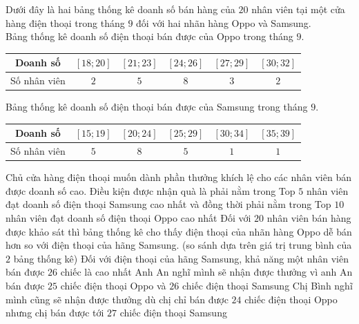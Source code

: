 \begin{ex}%
	Dưới đây là hai bảng thống kê doanh số bán hàng của $20$ nhân viên tại một cửa hàng  điện thoại trong tháng $9$ đối với hai nhãn hàng Oppo và Samsung.\\
	Bảng  thống kê doanh số điện thoại bán được của Oppo trong tháng $9$.
	\begin{center}
		\begin{tabular}{|c|c|c|c|c|c|}
			 \hline
			Doanh số &  $[18;20]$ & $[21;23]$ & $[24;26]$ & $[27;29]$ & $[30;32]$ \\ \hline
			Số nhân viên  & $2$ & $5$ & $8$ & $3$ & $2$ \\ \hline
		\end{tabular}
	\end{center}
	Bảng thống kê doanh số điện thoại bán được của Samsung  trong tháng $9$.
	\begin{center}
		\begin{tabular}{|c|c|c|c|c|c|}
			 \hline
			Doanh số & $[15;19]$ & $[20;24]$  & $[25;29]$ & $[30;34]$ & $[35;39]$ \\ \hline
			Số nhân viên & $5$ & $8$ & $5$ & $1$ & $1$ \\ \hline 
		\end{tabular}
	\end{center}
	Chủ cửa hàng điện thoại muốn dành phần thưởng khích lệ cho  các nhân viên bán được doanh số cao. Điều kiện được nhận quà là phải nằm trong Top $5$ nhân viên đạt doanh số điện thoại Samsung cao nhất và đồng thời phải nằm trong Top $10$ nhân viên đạt doanh số điện thoại Oppo cao nhất
	 \choiceTF
		{\True Đối với $20$ nhân viên bán hàng được khảo sát thì bảng thống  kê cho thấy điện thoại của nhãn hàng Oppo dễ bán hơn so với điện thoại của hãng Samsung. (so sánh dựa trên giá trị trung bình của $2$ bảng thống kê)}
		{Đối với điện thoại của hãng Samsung, khả năng một nhân  viên bán được $26$ chiếc là cao nhất}
		{Anh An nghĩ mình sẽ nhận được thưởng vì anh An bán được $25$ chiếc điện thoại Oppo và  $26$ chiếc điện thoại Samsung}
		{Chị Bình nghĩ mình cũng sẽ nhận được thưởng dù chị chỉ bán được  $24$ chiếc điện thoại Oppo nhưng chị bán được tới $27$ chiếc điện thoại Samsung}
	\loigiai{ 
		Ta có bảng số  liệu thống kê sau chuẩn hóa.\\
		Bảng thống kê doanh số điện thoại bán được  của Oppo trong tháng $9$.
		\begin{center}
			\begin{tabular}{|c|c|c|c|c|c|}
				 \hline
				Doanh số & $[17{,}5; 20{,}5)$ & $[20{,}5; 23{,}5)$ & $[23{,}5; 26{,}5)$ & $[26{,}5; 29{,}5)$ & $[29{,}5; 32{,}5)$  \\ \hline

\end{tabular}
\end{center}}
\end{ex}
